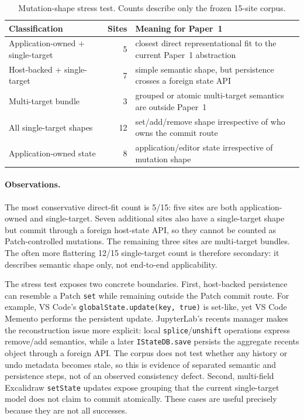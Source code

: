 \begin{table}[t]
\centering
\caption{Mutation-shape stress test. Counts describe only the frozen 15-site corpus.}
\label{tab:real-code-audit}
\small
\begin{tabular}{@{}lrp{67mm}@{}}
\toprule
Classification & Sites & Meaning for Paper~1 \\
\midrule
Application-owned + single-target & 5 & closest direct representational fit to the current Paper~1 abstraction \\
Host-backed + single-target & 7 & simple semantic shape, but persistence crosses a foreign state API \\
Multi-target bundle & 3 & grouped or atomic multi-target semantics are outside Paper~1 \\
\midrule
All single-target shapes & 12 & set/add/remove shape irrespective of who owns the commit route \\
Application-owned state & 8 & application/editor state irrespective of mutation shape \\
\bottomrule
\end{tabular}
\end{table}

\paragraph{Observations.}
The most conservative direct-fit count is 5/15: five sites are both application-owned and single-target. Seven additional sites also have a single-target shape but commit through a foreign host-state API, so they cannot be counted as Patch-controlled mutations. The remaining three sites are multi-target bundles. The often more flattering 12/15 single-target count is therefore secondary: it describes semantic shape only, not end-to-end applicability.

The stress test exposes two concrete boundaries. First, host-backed persistence can resemble a Patch \texttt{set} while remaining outside the Patch commit route. For example, VS Code's \texttt{globalState.update(key, true)} is set-like, yet VS Code Memento performs the persistent update. JupyterLab's recents manager makes the reconstruction issue more explicit: local \texttt{splice}/\texttt{unshift} operations express remove/add semantics, while a later \texttt{IStateDB.save} persists the aggregate recents object through a foreign API. The corpus does not test whether any history or undo metadata becomes stale, so this is evidence of separated semantic and persistence steps, not of an observed consistency defect. Second, multi-field Excalidraw \texttt{setState} updates expose grouping that the current single-target model does not claim to commit atomically. These cases are useful precisely because they are not all successes.

